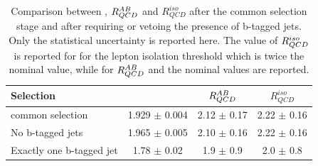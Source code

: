 \begin{table} [tp]
	\begin{center}
	\begin{tabular}{l  c c c }
\hline 
\hline
Selection  		&  \rqcd  			&  $R_{QCD}^{AB}$  		&  $R_{QCD}^{iso}$ \\ 
\hline
common selection 		&   1.929 $\pm$     0.004	&	2.12 $\pm$ 0.17		&	2.22 $\pm$ 0.16	\\
No b-tagged jets		&  1.965   $\pm$   0.005    	& 2.10   $\pm$	0.16 		&	2.22 $\pm$ 0.16	\\
Exactly one b-tagged jet	&  1.78    $\pm$   0.02 	& 1.9   $\pm$	0.9 		&	2.0  $\pm$ 0.8	\\
\hline
\hline
	\end{tabular}
	  \caption{Comparison between \rqcd, $R_{QCD}^{AB}$ and $R_{QCD}^{iso}$ after the common selection stage and after requiring
	or vetoing the presence of b-tagged jets. Only the statistical uncertainty is reported here.
	The value of $R_{QCD}^{iso}$ is reported for for the lepton isolation threshold which is twice the nominal value,
	while  for  $R_{QCD}^{AB}$ and \rqcd the nominal values are reported. }
	\label{table:MCsub}
	\end{center}
\end{table}


